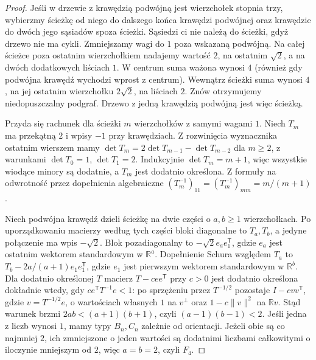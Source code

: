 \begin{proof}
Jeśli w drzewie z krawędzią podwójną jest wierzchołek
stopnia trzy, wybierzmy ścieżkę od niego do
dalszego końca krawędzi podwójnej oraz krawędzie
do dwóch jego sąsiadów spoza ścieżki. Sąsiedzi
ci nie należą do ścieżki, gdyż drzewo nie ma cykli.
Zmniejszamy wagi do $1$ poza wskazaną podwójną.
Na całej ścieżce poza ostatnim wierzchołkiem
nadajemy wartość $2$, na ostatnim $\sqrt2$,
a na dwóch dodatkowych liściach $1$.
W centrum suma ważona wynosi $4$ (również gdy
podwójna krawędź wychodzi wprost z centrum).
Wewnątrz ścieżki suma wynosi $4$, na jej ostatnim
wierzchołku $2\sqrt2$, na liściach $2$.
Znów otrzymujemy niedopuszczalny podgraf.
Drzewo z jedną krawędzią podwójną jest więc ścieżką.

Przyda się rachunek dla ścieżki $m$ wierzchołków
z samymi wagami $1$. Niech $T_m$ ma przekątną
$2$ i wpisy $-1$ przy krawędziach. Z rozwinięcia
wyznacznika ostatnim wierszem mamy
$\det T_m=2\det T_{m-1}-\det T_{m-2}$ dla $m\ge2$,
z warunkami $\det T_0=1$, $\det T_1=2$.
Indukcyjnie $\det T_m=m+1$, więc wszystkie wiodące
minory są dodatnie, a $T_m$ jest dodatnio określona.
Z formuły na odwrotność przez dopełnienia algebraiczne
$(T_m^{-1})_{11}=(T_m^{-1})_{mm}=m/(m+1)$.

Niech podwójna krawędź dzieli ścieżkę na dwie
części o $a,b\ge1$ wierzchołkach. Po uporządkowaniu
macierzy według tych części bloki diagonalne to
$T_a,T_b$, a jedyne połączenie ma wpis $-\sqrt2$.
Blok pozadiagonalny to $-\sqrt2 e_a e_1^{\mathsf T}$,
gdzie $e_a$ jest ostatnim wektorem standardowym
w $\mathbb R^a$. Dopełnienie Schura względem $T_a$ to
$T_b-2a/(a+1)e_1e_1^{\mathsf T}$, gdzie $e_1$
jest pierwszym wektorem standardowym w $\mathbb R^b$.
Dla dodatnio określonej $T$ macierz
$T-cee^{\mathsf T}$ przy $c>0$ jest dodatnio
określona dokładnie wtedy, gdy
$c e^{\mathsf T}T^{-1}e<1$: po sprzężeniu przez
$T^{-1/2}$ pozostaje $I-cvv^{\mathsf T}$,
gdzie $v=T^{-1/2}e$, o wartościach własnych
$1$ na $v^\perp$ oraz $1-c\|v\|^2$ na $\mathbb R v$.
Stąd warunek brzmi
$2ab<(a+1)(b+1)$, czyli $(a-1)(b-1)<2$.
Jeśli jedna z liczb wynosi $1$, mamy typy $B_n,C_n$
zależnie od orientacji. Jeżeli obie są co najmniej
$2$, ich zmniejszone o jeden wartości są dodatnimi
liczbami całkowitymi o iloczynie mniejszym od $2$,
więc $a=b=2$, czyli $F_4$.


\end{proof}
